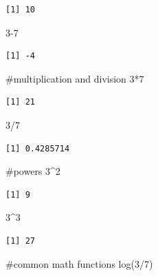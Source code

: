 \documentclass[
  letterpaper,
  DIV=11,
  numbers=noendperiod]{scrreprt}
\newenvironment{Shaded}{\begin{snugshade}}{\end{snugshade}}
\newcommand{\CommentTok}[1]{\textcolor[rgb]{0.37,0.37,0.37}{#1}}
\newcommand{\DecValTok}[1]{\textcolor[rgb]{0.68,0.00,0.00}{#1}}
\newcommand{\FunctionTok}[1]{\textcolor[rgb]{0.28,0.35,0.67}{#1}}
\newcommand{\NormalTok}[1]{\textcolor[rgb]{0.00,0.23,0.31}{#1}}
\newcommand{\SpecialCharTok}[1]{\textcolor[rgb]{0.37,0.37,0.37}{#1}}
\begin{document}
\begin{verbatim}
[1] 10
\end{verbatim}

\begin{Shaded}
\begin{Highlighting}[]
\DecValTok{3{-}7}
\end{Highlighting}
\end{Shaded}

\begin{verbatim}
[1] -4
\end{verbatim}

\begin{Shaded}
\begin{Highlighting}[]
\CommentTok{\#multiplication and division}
\DecValTok{3}\SpecialCharTok{*}\DecValTok{7}
\end{Highlighting}
\end{Shaded}

\begin{verbatim}
[1] 21
\end{verbatim}

\begin{Shaded}
\begin{Highlighting}[]
\DecValTok{3}\SpecialCharTok{/}\DecValTok{7}
\end{Highlighting}
\end{Shaded}

\begin{verbatim}
[1] 0.4285714
\end{verbatim}

\begin{Shaded}
\begin{Highlighting}[]
\CommentTok{\#powers}
\DecValTok{3}\SpecialCharTok{\^{}}\DecValTok{2}
\end{Highlighting}
\end{Shaded}

\begin{verbatim}
[1] 9
\end{verbatim}

\begin{Shaded}
\begin{Highlighting}[]
\DecValTok{3}\SpecialCharTok{\^{}}\DecValTok{3}
\end{Highlighting}
\end{Shaded}

\begin{verbatim}
[1] 27
\end{verbatim}

\begin{Shaded}
\begin{Highlighting}[]
\CommentTok{\#common math functions}
\FunctionTok{log}\NormalTok{(}\DecValTok{3}\SpecialCharTok{/}\DecValTok{7}\NormalTok{)}
\end{Highlighting}
\end{Shaded}
\end{document}
